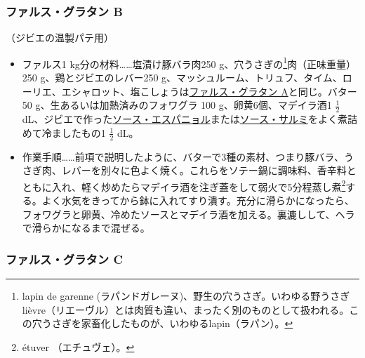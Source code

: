 \begin{recette}
\hypertarget{farce-gratin-b}{%
\subsubsection{ファルス・グラタン B}\label{farce-gratin-b}}


（ジビエの温製パテ用）


\begin{itemize}
\item
  ファルス1 kg分の材料\ldots{}\ldots{}塩漬け豚バラ肉250
  g、穴うさぎの\footnote{lapin de garenne
    (ラパンドガレーヌ)、野生の穴うさぎ。いわゆる野うさぎlièvre（リエーヴル）とは肉質も違い、まったく別のものとして扱われる。この穴うさぎを家畜化したものが、いわゆるlapin（ラパン）。}肉（正味重量）250
  g、鶏とジビエのレバー250
  g、マッシュルーム、トリュフ、タイム、ローリエ、エシャロット、塩こしょうは\protect\hyperlink{farce-gratin-a}{ファルス・グラタン
  A}と同じ。バター50 g、生あるいは加熱済みのフォワグラ 100
  g、卵黄6個、マデイラ酒1 \(\frac{1}{2}\)
  dL、ジビエで作った\protect\hyperlink{sauce-espagnole}{ソース・エスパニョル}または\protect\hyperlink{sauce-salmis}{ソース・サルミ}をよく煮詰めて冷ましたもの1
  \(\frac{1}{2}\) dL。
\item
  作業手順\ldots{}\ldots{}前項で説明したように、バターで3種の素材、つまり豚バラ、うさぎ肉、レバーを別々に色よく焼く。これらをソテー鍋に調味料、香辛料とともに入れ、軽く炒めたらマデイラ酒を注ぎ蓋をして弱火で5分程蒸し煮\footnote{étuver
    （エチュヴェ）。}する。よく水気をきってから鉢に入れてすり潰す。充分に滑らかになったら、フォワグラと卵黄、冷めたソースとマデイラ酒を加える。裏漉しして、ヘラで滑らかになるまで混ぜる。
\end{itemize}

\hypertarget{farce-gratin-c}{%
\subsubsection{ファルス・グラタン C}\label{farce-gratin-c}}




\end{recette}
